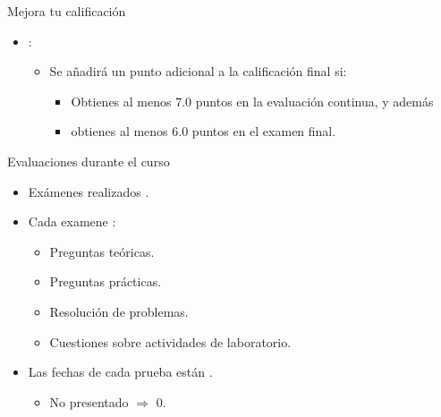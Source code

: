 \begin{frame}[t]{Mejora tu calificación}
\begin{itemize}
  \item {}:
    \begin{itemize}
      \item Se añadirá un punto adicional a la calificación final si:
        \begin{itemize}
          \item Obtienes al menos 7.0 puntos en la evaluación continua, y además
          \item obtienes al menos 6.0 puntos en el examen final.
        \end{itemize}
    \end{itemize}
\end{itemize}
\end{frame}

\begin{frame}[t]{Evaluaciones durante el curso}
\begin{itemize}
  \item Exámenes realizados .

  \item Cada examene :
    \begin{itemize}
      \item Preguntas teóricas.
      \item Preguntas prácticas.
      \item Resolución de problemas.
      \item Cuestiones sobre actividades de laboratorio.
    \end{itemize}

  \item Las fechas de cada prueba están .

    \begin{itemize}
      \item No presentado $\Rightarrow$ 0.
    \end{itemize}
\end{itemize}
\end{frame}

